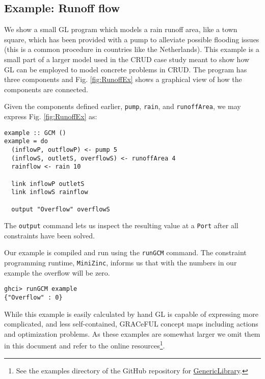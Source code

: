\subsection{Example: Runoff flow}
\label{example-runoff-flow}

We show a small GL program which models a rain runoff area, like a
town square, which has been provided with a pump to alleviate possible
flooding issues (this is a common procedure in countries like the
Netherlands).
%
This example is a small part of a larger model used in the CRUD case
study meant to show how GL can be employed to model concrete problems
in CRUD.
%
The program has three components and Fig. \ref{fig:RunoffEx} shows a
graphical view of how the components are connected.
%

Given the components defined earlier, \texttt{pump}, \texttt{rain}, and \texttt{runoffArea},
we may express Fig. \ref{fig:RunoffEx} as:
\begin{verbatim}
example :: GCM ()
example = do
  (inflowP, outflowP) <- pump 5
  (inflowS, outletS, overflowS) <- runoffArea 4
  rainflow <- rain 10

  link inflowP outletS
  link inflowS rainflow

  output "Overflow" overflowS
\end{verbatim}
The \texttt{output} command lets us inspect the resulting value at a \texttt{Port}
after all constraints have been solved.

Our example is compiled and run using the \texttt{runGCM} command.
%
The constraint programming runtime, \texttt{MiniZinc}, informs us
that with the numbers in our example the overflow will be zero.

\begin{verbatim}
ghci> runGCM example
{"Overflow" : 0}
\end{verbatim}

While this example is easily calculated by hand GL is capable of
expressing more complicated, and less self-contained, GRACeFUL concept
maps including actions and optimization problems.
%
As these examples are somewhat larger we omit them in this document
and refer to the online resources\footnote{See the examples directory
  of the GitHub repository for
  \href{https://github.com/GRACeFUL-project/GenericLibrary}{GenericLibrary}.}.

